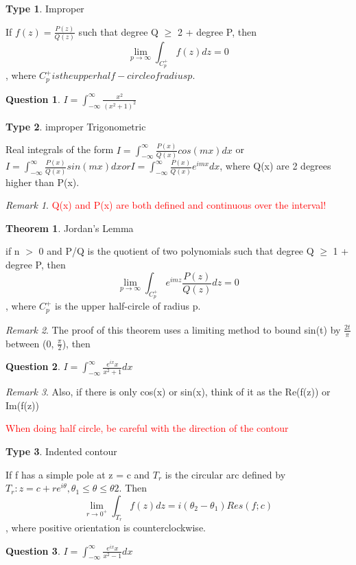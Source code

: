 \documentclass[10pt,landscape]{article}
\newcommand\todo[1]{\textcolor{red}{#1}}
\theoremstyle{definition}
\newtheorem*{question}{Question}
\newtheorem{theorem}{Theorem}
\newtheorem{type}{Type}
\theoremstyle{remark}
\newtheorem*{remark}{Remark}
\begin{document}
\begin{multicols}{3}
\begin{type} Improper \par
If $f(z) = \frac{P(z)}{Q(z)}$ such that degree Q $\geq$ 2 + degree P, then $$\lim_{p \rightarrow  \infty} \int_{C_p^+} f(z)dz = 0$$, where $C^+_p is the upper half-circle of radius p.$
\end{type}

\begin{question}
$I = \int^\infty_{-\infty} \frac{x^2}{(x^2 + 1)^2}$
\end{question}

\begin{type} improper Trigonometric \par
Real integrals of the form $I = \int^\infty_{-\infty} \frac{P(x)}{Q(x)}cos(mx) dx $ or $I = \int^\infty_{-\infty} \frac{P(x)}{Q(x)} sin(mx) dx or I = \int^\infty_{-\infty} \frac{P(x)}{Q(x)} e^{imx} dx $, where Q(x) are 2 degrees higher than P(x).
\end{type}
\begin{remark}
\todo{Q(x) and P(x) are both defined and continuous over the interval!}
\end{remark}

\begin{theorem} Jordan's Lemma \par
if n $>$ 0  and P/Q is the quotient of two polynomials such that degree Q $\geq$ 1 + degree P, then $$\lim_{p \rightarrow \infty} \int_{C^+_p} e^{imz} \frac{P(z)}{Q(z)} dz = 0$$, where $C^+_p$ is the upper half-circle of radius p. 
\end{theorem}

\begin{remark}
The proof of this theorem uses a limiting method to bound sin(t) by $\frac{2t}{\pi}$ between (0, $\frac{\pi}{2}$), then 
\end{remark}

\begin{question}
$I = \int^\infty_{-\infty} \frac{e^{ix}x}{x^2+1} dx$
\end{question}

\begin{remark}
Also, if there is only cos(x) or sin(x), think of it as the Re(f(z)) or Im(f(z))
\end{remark}

\todo{When doing half circle, be careful with the direction of the contour}


\begin{type} Indented contour \par
If f has a simple pole at z = c and $T_r$ is the circular arc defined by $T_r: z = c + re^{i\theta}, {\theta_1 \leq \theta \leq \theta2}$. Then $$\lim_{r \rightarrow 0^+} \int_{T_r} f(z) dz = i (\theta_2 -\theta_1) Res(f;c)$$, where positive orientation is counterclockwise. 
\end{type}
\begin{question}
$I = \int^\infty_{-\infty} \frac{e^{ix}x}{x^2-1} dx$
\end{question}


\end{multicols}
\end{document}
